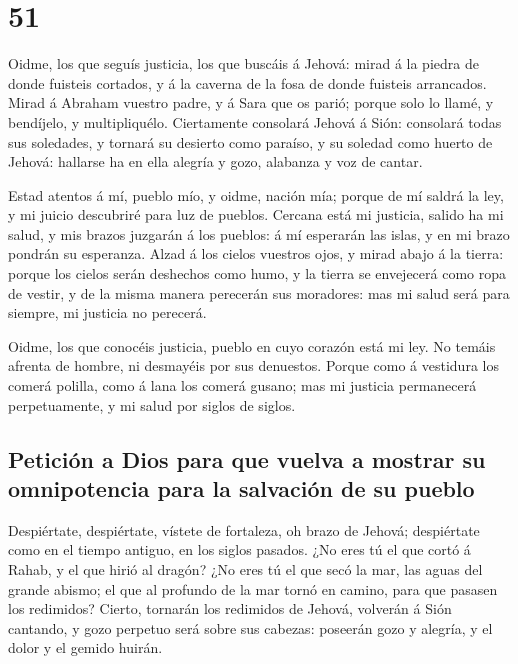 \hypertarget{section-50}{%
\section{51}\label{section-50}}

 Oidme, los que seguís justicia, los que buscáis á Jehová:
mirad á la piedra de donde fuisteis cortados, y á la caverna de la fosa
de donde fuisteis arrancados.  Mirad á Abraham vuestro
padre, y á Sara que os parió; porque solo lo llamé, y bendíjelo, y
multipliquélo.  Ciertamente consolará Jehová á Sión:
consolará todas sus soledades, y tornará su desierto como paraíso, y su
soledad como huerto de Jehová: hallarse ha en ella alegría y gozo,
alabanza y voz de cantar.

 Estad atentos á mí, pueblo mío, y oidme, nación mía; porque
de mí saldrá la ley, y mi juicio descubriré para luz de pueblos.
 Cercana está mi justicia, salido ha mi salud, y mis brazos
juzgarán á los pueblos: á mí esperarán las islas, y en mi brazo pondrán
su esperanza.  Alzad á los cielos vuestros ojos, y mirad
abajo á la tierra: porque los cielos serán deshechos como humo, y la
tierra se envejecerá como ropa de vestir, y de la misma manera perecerán
sus moradores: mas mi salud será para siempre, mi justicia no perecerá.

 Oidme, los que conocéis justicia, pueblo en cuyo corazón
está mi ley. No temáis afrenta de hombre, ni desmayéis por sus
denuestos.  Porque como á vestidura los comerá polilla, como
á lana los comerá gusano; mas mi justicia permanecerá perpetuamente, y
mi salud por siglos de siglos.

\hypertarget{peticiuxf3n-a-dios-para-que-vuelva-a-mostrar-su-omnipotencia-para-la-salvaciuxf3n-de-su-pueblo}{%
\subsection{Petición a Dios para que vuelva a mostrar su omnipotencia
para la salvación de su
pueblo}\label{peticiuxf3n-a-dios-para-que-vuelva-a-mostrar-su-omnipotencia-para-la-salvaciuxf3n-de-su-pueblo}}

 Despiértate, despiértate, vístete de fortaleza, oh brazo de
Jehová; despiértate como en el tiempo antiguo, en los siglos pasados.
¿No eres tú el que cortó á Rahab, y el que hirió al dragón?
 ¿No eres tú el que secó la mar, las aguas del grande
abismo; el que al profundo de la mar tornó en camino, para que pasasen
los redimidos?  Cierto, tornarán los redimidos de Jehová,
volverán á Sión cantando, y gozo perpetuo será sobre sus cabezas:
poseerán gozo y alegría, y el dolor y el gemido huirán.

